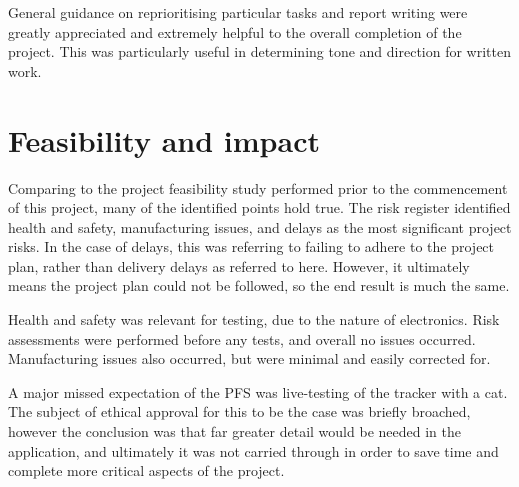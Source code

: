 \documentclass[11pt]{article}
\begin{document}
General guidance on reprioritising particular tasks and report writing were greatly appreciated and extremely helpful 
to the overall completion of the project. This was particularly useful in determining tone and direction for written work. 

\section{Feasibility and impact}
Comparing to the project feasibility study performed prior to the commencement of this project, 
many of the identified points hold true. 
The risk register identified health and safety, manufacturing issues, and delays as the 
most significant project risks. In the case of delays, this was referring to failing to 
adhere to the project plan, rather than delivery delays as referred to here. However, 
it ultimately means the project plan could not be followed, so the end result is much the same. 

Health and safety was relevant for testing, due to the nature of electronics. Risk assessments were performed 
before any tests, and overall no issues occurred. Manufacturing issues also occurred, but were 
minimal and easily corrected for.

A major missed expectation of the PFS was live-testing of the tracker with a cat. The subject of ethical 
approval for this to be the case was briefly broached, however the conclusion was that far greater detail 
would be needed in the application, and ultimately it was not carried through in order to save time 
and complete more critical aspects of the project. 
\end{document}
